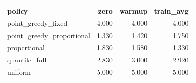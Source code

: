 \begin{tabular}{lrrr}
\toprule
policy & zero & warmup & train\_avg \\
\midrule
point\_greedy\_fixed & 4.000 & 4.000 & 4.000 \\
point\_greedy\_proportional & 1.330 & 1.420 & 1.750 \\
proportional & 1.830 & 1.580 & 1.330 \\
quantile\_full & 2.830 & 3.000 & 2.920 \\
uniform & 5.000 & 5.000 & 5.000 \\
\bottomrule
\end{tabular}
